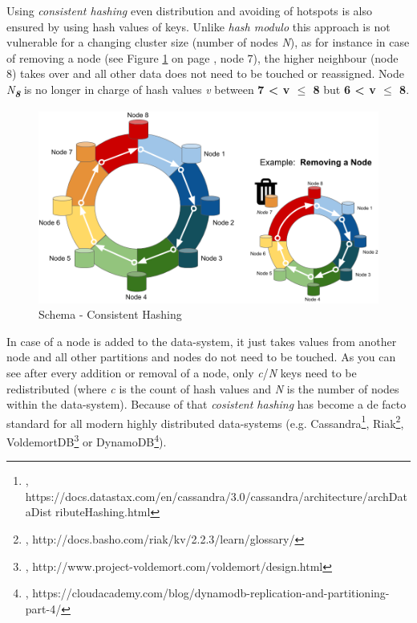 {Using \textit{consistent hashing} even distribution and avoiding of hotspots is also ensured by using hash values of keys. Unlike \textit{hash modulo} this approach is not vulnerable for a changing cluster size (number of nodes \textit{N}), as for instance in case of removing a node (see Figure \ref{partitioning_consistent_hashing} on page \pageref{partitioning_consistent_hashing}, node 7), the higher neighbour (node 8) takes over and all other data does not need to be touched or reassigned. Node \textit{N\textsubscript{\textbf{8}}} is no longer in charge of hash values \textit{v} between \textbf{7 < v $\leq$ 8} but \textbf{6 < v $\leq$ 8}. 

\begin{figure}[h]
	\centering
  \includegraphics[width=1\textwidth]{partitioning_consistent_hashing.png}
	\caption{Schema - Consistent Hashing}
	\label{partitioning_consistent_hashing}
\end{figure}

In case of a node is added to the data-system, it just takes values from another node and all other partitions and nodes do not need to be touched. As you can see after every addition or removal of a node, only \textit{c}/\textit{N} keys need to be redistributed (where \textit{c} is the count of hash values and \textit{N} is the number of nodes within the data-system). Because of that \textit{cosistent hashing} has become a de facto standard for all modern highly distributed data-systems (e.g. Cassandra\footnote{\cite{CASCH}, https://docs.datastax.com/en/cassandra/3.0/cassandra/architecture/archDataDist ributeHashing.html}, Riak\footnote{\cite{RIAKCH}, http://docs.basho.com/riak/kv/2.2.3/learn/glossary/}, VoldemortDB\footnote{\cite{VDBCH}, http://www.project-voldemort.com/voldemort/design.html} or DynamoDB\footnote{\cite{DYNDBCH}, https://cloudacademy.com/blog/dynamodb-replication-and-partitioning-part-4/}).\\

}
